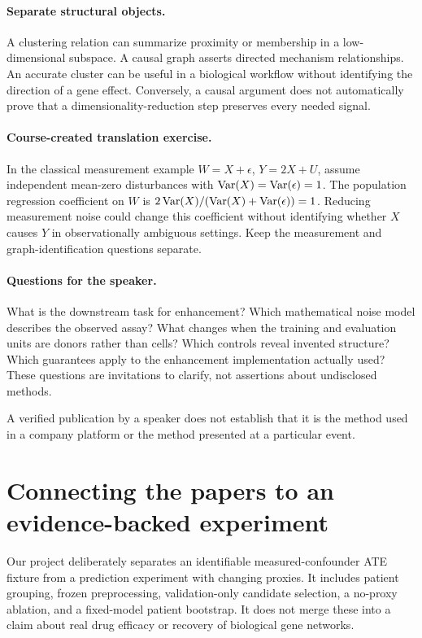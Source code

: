 \documentclass[11pt]{scrartcl}
\begin{document}
\paragraph{Separate structural objects.} A clustering relation can summarize proximity
or membership in a low-dimensional subspace. A causal graph asserts directed mechanism
relationships. An accurate cluster can be useful in a biological workflow without
identifying the direction of a gene effect. Conversely, a causal argument does not
automatically prove that a dimensionality-reduction step preserves every needed signal.

\paragraph{Course-created translation exercise.} In the classical measurement example
$W=X+\epsilon$, $Y=2X+U$, assume independent mean-zero disturbances with
$\operatorname{Var}(X)=\operatorname{Var}(\epsilon)=1$. The population regression coefficient on $W$ is
$2\operatorname{Var}(X)/(\operatorname{Var}(X)+\operatorname{Var}(\epsilon))=1$. Reducing measurement noise could change
this coefficient without identifying whether $X$ causes $Y$ in observationally
ambiguous settings. Keep the measurement and graph-identification questions separate.

\paragraph{Questions for the speaker.} What is the downstream task for enhancement?
Which mathematical noise model describes the observed assay? What changes when the
training and evaluation units are donors rather than cells? Which controls reveal
invented structure? Which guarantees apply to the enhancement implementation actually
used? These questions are invitations to clarify, not assertions about undisclosed methods.

\begin{pitfall}
A verified publication by a speaker does not establish that it is the method used
in a company platform or the method presented at a particular event.
\end{pitfall}

\clearpage
\section*{Connecting the papers to an evidence-backed experiment}
Our project deliberately separates an identifiable measured-confounder ATE fixture
from a prediction experiment with changing proxies. It includes patient grouping,
frozen preprocessing, validation-only candidate selection, a no-proxy ablation, and
a fixed-model patient bootstrap. It does not merge these into a claim about real
drug efficacy or recovery of biological gene networks.
\end{document}
